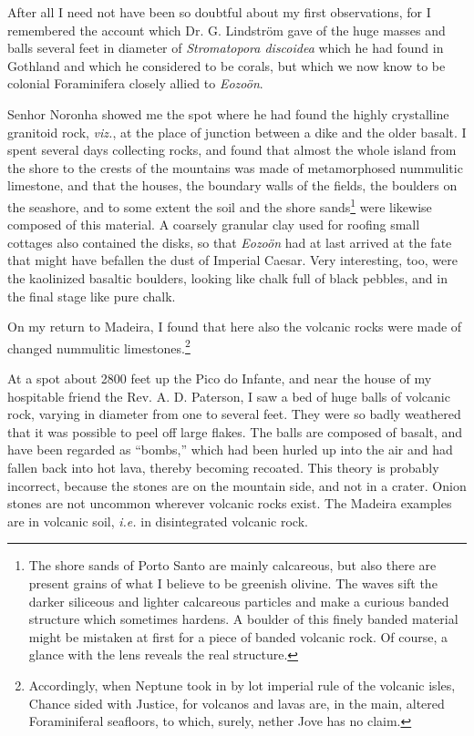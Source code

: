 \documentclass[a4paper, 12pt, oneside]{article}
\begin{document}
After all I need not have been so doubtful about my first observations, for I remembered the account which Dr. G. Lindström gave of the huge masses and balls several feet in diameter of \emph{Stromatopora discoidea} which he had found in Gothland and which he considered to be corals, but which we now know to be colonial Foraminifera closely allied to \emph{Eozoön}.

Senhor Noronha showed me the spot where he had found the highly crystalline granitoid rock, \emph{viz.}, at the place of junction between a dike and the older basalt. I spent several days collecting rocks, and found that almost the whole island from the shore to the crests of the mountains was made of metamorphosed nummulitic limestone, and that the houses, the boundary walls of the fields, the boulders on the seashore, and to some extent the soil and the shore sands\footnote{The shore sands of Porto Santo are mainly calcareous, but also there are present grains of what I believe to be greenish olivine. The waves sift the darker siliceous and lighter calcareous particles and make a curious banded structure which sometimes hardens. A boulder of this finely banded material might be mistaken at first for a piece of banded volcanic rock. Of course, a glance with the lens reveals the real structure.} were likewise composed of this material. A coarsely granular clay used for roofing small cottages also contained the disks, so that \emph{Eozoön} had at last arrived at the fate that might have befallen the dust of Imperial Caesar. Very interesting, too, were the kaolinized basaltic boulders, looking like chalk full of black pebbles, and in the final stage like pure chalk.

On my return to Madeira, I found that here also the volcanic rocks were made of changed nummulitic limestones.\footnote{Accordingly, when Neptune took in by lot imperial rule of the volcanic isles, Chance sided with Justice, for volcanos and lavas are, in the main, altered Foraminiferal seafloors, to which, surely, nether Jove has no claim.}

At a spot about 2800 feet up the Pico do Infante, and near the house of my hospitable friend the Rev. A. D. Paterson, I saw a bed of huge balls of volcanic rock, varying in diameter from one to several feet. They were so badly weathered that it was possible to peel off large flakes. The balls are composed of basalt, and have been regarded as ``bombs,'' which had been hurled up into the air and had fallen back into hot lava, thereby becoming recoated. This theory is probably incorrect, because the stones are on the mountain side, and not in a crater. Onion stones are not uncommon wherever volcanic rocks exist. The Madeira examples are in volcanic soil, \emph{i.e.} in disintegrated volcanic rock.
\end{document}
